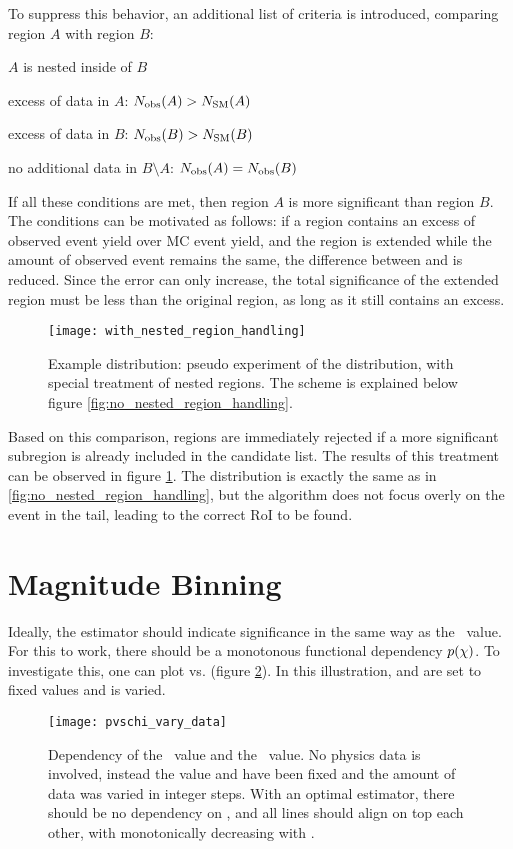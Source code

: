 To suppress this behavior, an additional list of criteria is introduced, comparing region $A$ with region $B$:
\begin{my_list}
	\item $A$ is nested inside of $B$
	\item excess of data in $A$: ${N_\mathrm{obs}}(A) > {N_\mathrm{SM}}(A)$
	\item excess of data in $B$: ${N_\mathrm{obs}}(B) > {N_\mathrm{SM}}(B)$
	\item no additional data in $B \setminus A$: ${N_\mathrm{obs}}(A) = {N_\mathrm{obs}}(B)$
\end{my_list}
If all these conditions are met, then region $A$ is more significant than region $B$.
The conditions can be motivated as follows: if a region contains an excess of observed event yield over MC event yield, and the region is extended while the amount of observed event remains the same, the difference between \Nmc and \Ndata is reduced. Since the error \sigmamc can only increase, the total significance of the extended region must be less than the original region, as long as it still contains an excess.

\begin{figure}[htbp]
	\centering
	\texttt{[image: with\_nested\_region\_handling]}
	\caption{Example distribution: pseudo experiment of the  \sumpT distribution, with special treatment of nested regions. The scheme is explained below figure \ref{fig:no_nested_region_handling}. }
	\label{fig:with_nested_region_handling}
\end{figure}
Based on this comparison, regions are immediately rejected if a more significant subregion is already included in the candidate list. The results of this treatment can be observed in figure \ref{fig:with_nested_region_handling}. The distribution is exactly the same as in \ref{fig:no_nested_region_handling}, but the algorithm does not focus overly on the event in the tail, leading to the correct RoI to be found.

\section{Magnitude Binning}
Ideally, the estimator should indicate significance in the same way as the \p~value. For this to work, there should be a monotonous functional dependency $p(\chi)$. To investigate this, one can plot \mychi vs. \p (figure \ref{fig:pvschi_vary_data}). In this illustration, \Nmc and \sigmamc are set to fixed values and \Ndata is varied. 
\begin{figure}[htbp]
	\centering
	\texttt{[image: pvschi\_vary\_data]}
	\caption{Dependency of the \mychi~value and the \p~value. No physics data is involved, instead the value \Nmc and \sigmamc have been fixed and the amount of data \Ndata was varied in integer steps. With an optimal estimator, there should be no dependency on \Nmc, and all lines should align on top each other, with \mychi monotonically decreasing with \p.}
	\label{fig:pvschi_vary_data}
\end{figure}

